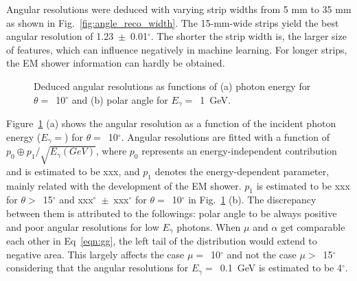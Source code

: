 \documentclass[preprint,12pt,times,a4paper]{elsarticle}
\begin{document}
Angular resolutions were deduced with varying strip widths from 5 mm to 35 mm as shown in Fig.~\ref{fig:angle_reco_width}. The 15-mm-wide strips yield the best angular resolution of 1.23~$\pm$~0.01$^{\circ}$. The shorter the strip width is, the larger size of features, which can influence negatively in machine learning. For longer strips, the EM shower information can hardly be obtained.

\begin{figure}[!hbt]
\centering
{}
\caption{ Deduced angular resolutions as functions of (a) photon energy for $\theta=$~10$^{\circ}$ and (b) polar angle for $E_{\gamma}=$~1~GeV. }
\label{fig:angle_reco_dep_gr}
\end{figure}

Figure~\ref{fig:angle_reco_dep_gr} (a) shows the angular resolution as a function of the incident photon energy ($E_{\gamma}=$) for $\theta=$~10$^{\circ}$. Angular resolutions are fitted with a function of $p_{0} \oplus p_{1}/\sqrt{E_{\gamma}(GeV)}$, where $p_{0}$ represents an energy-independent contribution and is estimated to be xxx, and $p_{1}$ denotes the energy-dependent parameter, mainly related with the development of the EM shower. $p_{1}$ is estimated to be xxx for $\theta>$~15$^{\circ}$ and xxx$^{\circ}$~$\pm$~xxx$^{\circ}$ for $\theta=$~10$^{\circ}$ in Fig.~\ref{fig:angle_reco_dep_gr} (b). The discrepancy between them is attributed to the followings: polar angle to be always positive and poor angular resolutions for low $E_{\gamma}$ photons. When $\mu$ and $\alpha$ get comparable each other in Eq~\ref{eqn:gg}, the left tail of the distribution would extend to negative area. This largely affects the case $\mu=$~10$^{\circ}$ and not the case $\mu>$~15$^{\circ}$ considering that the angular resolutions for $E_{\gamma}=$~0.1~GeV is estimated to be 4$^{\circ}$. 
\end{document}
